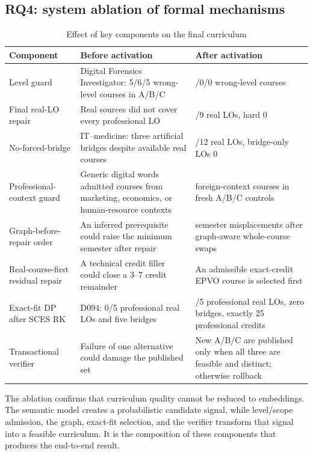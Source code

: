 \documentclass[twoside,11pt]{article}
\begin{document}
\subsection{RQ4: system ablation of formal mechanisms}

\begin{table}[H]
\centering
\caption{Effect of key components on the final curriculum}
\label{tab:ablation}
\small
\begin{tabularx}{\linewidth}{>{\raggedright\arraybackslash}p{3.1cm}>{\raggedright\arraybackslash}X>{\raggedright\arraybackslash}X}
\toprule
\textbf{Component} & \textbf{Before activation} & \textbf{After activation}\\
\midrule
Level guard & Digital Forensics Investigator: 5/6/5 wrong-level courses in A/B/C & 0/0/0 wrong-level courses\\
Final real-LO repair & Real sources did not cover every professional LO & 9/9 real LOs, hard 0\\
No-forced-bridge & IT--medicine: three artificial bridges despite available real courses & 12/12 real LOs, bridge-only LOs 0\\
Professional-context guard & Generic digital words admitted courses from marketing, economics, or human-resource contexts & 0 foreign-context courses in fresh A/B/C controls\\
Graph-before-repair order & An inferred prerequisite could raise the minimum semester after repair & 0 semester misplacements after graph-aware whole-course swaps\\
Real-course-first residual repair & A technical credit filler could close a 3--7 credit remainder & An admissible exact-credit EPVO course is selected first\\
Exact-fit DP after SCES RK & D094: 0/5 professional real LOs and five bridges & 5/5 professional real LOs, zero bridges, exactly 25 professional credits\\
Transactional verifier & Failure of one alternative could damage the published set & New A/B/C are published only when all three are feasible and distinct; otherwise rollback\\
\bottomrule
\end{tabularx}
\end{table}

The ablation confirms that curriculum quality cannot be reduced to embeddings. The semantic model creates a probabilistic candidate signal, while level/scope admission, the graph, exact-fit selection, and the verifier transform that signal into a feasible curriculum. It is the composition of these components that produces the end-to-end result.
\end{document}
